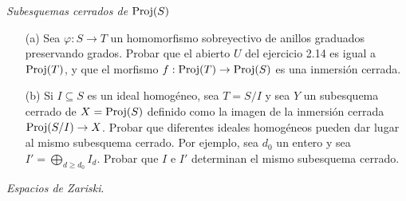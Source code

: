 \documentclass[twoside]{article}
\begin{document}
%
\newpage
%
\begin{ejercicio}{3.12}\emph{Subesquemas cerrados de $\operatorname{Proj}(S)$}
\begin{enumerate}
\item[(a)]Sea $\varphi:S\to T$ un homomorfismo sobreyectivo de anillos graduados preservando grados. Probar que el abierto $U$ del ejercicio 2.14 es igual a $\operatorname{Proj}(T)$, y que el morfismo $f:\operatorname{Proj}(T)\to\operatorname{Proj}(S)$ es una inmersión cerrada.
\item[(b)] Si $I\subseteq S$ es un ideal homogéneo, sea $T=S/I$ y sea $Y$ un subesquema cerrado de $X=\operatorname{Proj}(S)$ definido como la imagen de la inmersión cerrada $\operatorname{Proj}(S/I)\to X$. Probar que diferentes ideales homogéneos pueden dar lugar al mismo subesquema cerrado. Por ejemplo, sea $d_0$ un entero y sea $I'=\bigoplus_{d\geq d_0}I_d$. Probar que $I$ e $I'$ determinan el mismo subesquema cerrado.
\end{enumerate}
\end{ejercicio}
\begin{solucion}
\end{solucion}
\newpage
\begin{ejercicio}{3.17}\emph{Espacios de Zariski}. 


\end{ejercicio}
\begin{solucion}
%
\end{solucion}

\newpage
\end{document}
